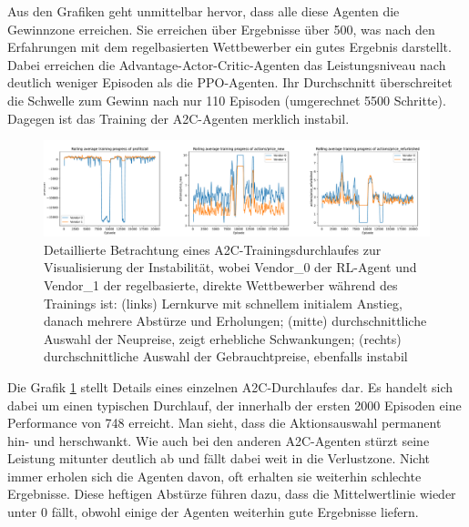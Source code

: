 Aus den Grafiken geht unmittelbar hervor, dass alle diese Agenten die Gewinnzone erreichen.
Sie erreichen über Ergebnisse über 500, was nach den Erfahrungen mit dem regelbasierten Wettbewerber ein gutes Ergebnis darstellt.
Dabei erreichen die Advantage-Actor-Critic-Agenten das Leistungsniveau nach deutlich weniger Episoden als die PPO-Agenten.
Ihr Durchschnitt überschreitet die Schwelle zum Gewinn nach nur 110 Episoden (umgerechnet 5500 Schritte).
Dagegen ist das Training der A2C-Agenten merklich instabil.
\begin{figure}[htbp]
	\centering
	\includegraphics[width=\textwidth]{main/a2c_detailed_analysis.pdf}
	\caption{
		Detaillierte Betrachtung eines A2C-Trainingsdurchlaufes zur Visualisierung der Instabilität, wobei Vendor\_0 der RL-Agent und Vendor\_1 der regelbasierte, direkte Wettbewerber während des Trainings ist:
		(links) Lernkurve mit schnellem initialem Anstieg, danach mehrere Abstürze und Erholungen;
		(mitte) durchschnittliche Auswahl der Neupreise, zeigt erhebliche Schwankungen;
		(rechts) durchschnittliche Auswahl der Gebrauchtpreise, ebenfalls instabil
	}
	\label{grafic:A2CInstability}
\end{figure}
Die Grafik \ref{grafic:A2CInstability} stellt Details eines einzelnen A2C-Durchlaufes dar.
Es handelt sich dabei um einen typischen Durchlauf, der innerhalb der ersten 2000 Episoden eine Performance von 748 erreicht.
Man sieht, dass die Aktionsauswahl permanent hin- und herschwankt.
Wie auch bei den anderen A2C-Agenten stürzt seine Leistung mitunter deutlich ab und fällt dabei weit in die Verlustzone.
Nicht immer erholen sich die Agenten davon, oft erhalten sie weiterhin schlechte Ergebnisse.
Diese heftigen Abstürze führen dazu, dass die Mittelwertlinie wieder unter 0 fällt, obwohl einige der Agenten weiterhin gute Ergebnisse liefern.

